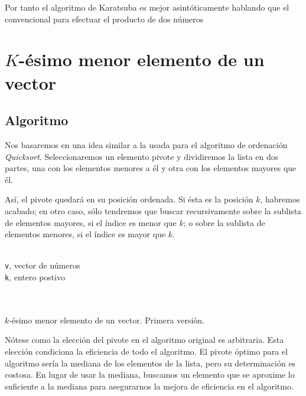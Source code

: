 \documentclass[a4paper, 11pt]{article} %
\begin{document}
Por tanto el algoritmo de Karatsuba es mejor asintóticamente hablando que el convencional para efectuar
el producto de dos números

\section {$K$-ésimo menor elemento de un vector}
  \subsection{Algoritmo}
    Nos basaremos en una idea similar a la usada para el algoritmo de ordenación \textit{Quicksort}.
    Seleccionaremos un elemento pivote y dividiremos la lista en dos partes, una con los elementos menores
    a él y otra con los elementos mayores que él.
    
    Así, el pivote quedará en su posición ordenada. Si ésta es
    la posición $k$, habremos acabado; en otro caso, sólo tendremos que buscar recursivamente sobre la 
    sublista de elementos mayores, si el índice es menor que $k$; o sobre la sublista de elementos menores, si el
    índice es mayor que $k$.
    
    \begin{algorithm}[H]
	\begin{algorithmic}[1]
		  \REQUIRE \ \\
		  \texttt{v}, vector de números\\
		  \texttt{k}, entero postivo\\\
	  \\\
	    \RETURN {pivote}
	  \ELSE
	  \ENDIF
	\end{algorithmic}
      \caption{$k$-ésimo menor elemento de un vector. Primera versión.}
      \label{kesimo}
    \end{algorithm}

    Nótese como la elección del pivote en el algoritmo original es arbitraria. Esta elección condiciona la eficiencia de
    todo el algoritmo. El pivote óptimo para el algoritmo sería la mediana de los elementos de la lista, pero su determinación
    es costosa. En lugar de usar la mediana, buscamos un elemento que se aproxime lo suficiente a la mediana para asegurarnos
    la mejora de eficiencia en el algoritmo.
    
\end{document}
